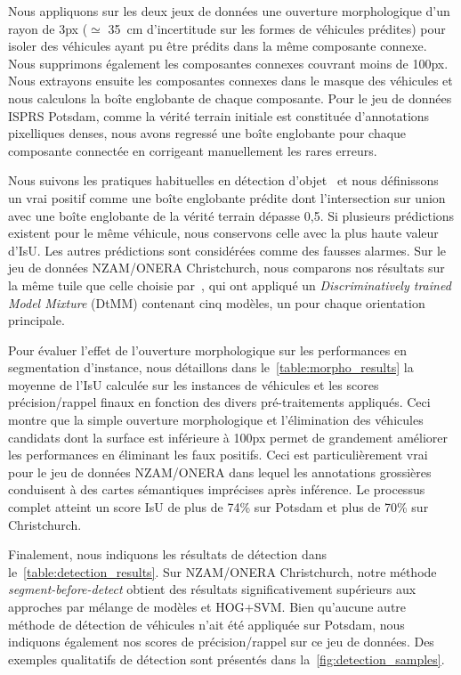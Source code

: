 Nous appliquons sur les deux jeux de données une ouverture morphologique d'un rayon de 3px ($\simeq$ \SI{35}{\centi\meter} d'incertitude sur les formes de véhicules prédites) pour isoler des véhicules ayant pu être prédits dans la même composante connexe. Nous supprimons également les composantes connexes couvrant moins de 100px. Nous extrayons ensuite les composantes connexes dans le masque des véhicules et nous calculons la boîte englobante de chaque composante. Pour le jeu de données \gls{ISPRS} Potsdam, comme la vérité terrain initiale est constituée d'annotations pixelliques denses, nous avons regressé une boîte englobante pour chaque composante connectée en corrigeant manuellement les rares erreurs.

Nous suivons les pratiques habituelles en détection d'objet~\cite{everingham_pascal_2014} et nous définissons un vrai positif comme une boîte englobante prédite dont l'intersection sur union avec une boîte englobante de la vérité terrain dépasse 0,5. Si plusieurs prédictions existent pour le même véhicule, nous conservons celle avec la plus haute valeur d'\gls{IsU}. Les autres prédictions sont considérées comme des fausses alarmes. Sur le jeu de données NZAM/ONERA Christchurch, nous comparons nos résultats sur la même tuile que celle choisie par~\citet{randrianarivo_contextual_2016}, qui ont appliqué un \emph{Discriminatively trained Model Mixture} (DtMM) contenant cinq modèles, un pour chaque orientation principale.

Pour évaluer l'effet de l'ouverture morphologique sur les performances en segmentation d'instance, nous détaillons dans le~\cref{table:morpho_results} la moyenne de l'\gls{IsU} calculée sur les instances de véhicules et les scores précision/rappel finaux en fonction des divers pré-traitements appliqués. Ceci montre que la simple ouverture morphologique et l'élimination des véhicules candidats dont la surface est inférieure à 100px permet de grandement améliorer les performances en éliminant les faux positifs. Ceci est particulièrement vrai pour le jeu de données NZAM/ONERA dans lequel les annotations grossières conduisent à des cartes sémantiques imprécises après inférence. Le processus complet atteint un score \gls{IsU} de plus de 74\% sur Potsdam et plus de 70\% sur Christchurch.

Finalement, nous indiquons les résultats de détection dans le~\cref{table:detection_results}. Sur NZAM/ONERA Christchurch, notre méthode \textit{segment-before-detect} obtient des résultats significativement supérieurs aux approches par mélange de modèles et \gls{HOG}+\gls{SVM}. Bien qu'aucune autre méthode de détection de véhicules n'ait été appliquée sur Potsdam, nous indiquons également nos scores de précision/rappel sur ce jeu de données. Des exemples qualitatifs de détection sont présentés dans la~\cref{fig:detection_samples}.

